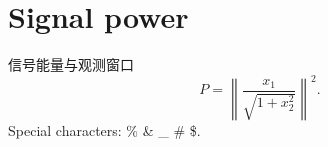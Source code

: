 \documentclass{article}
\newcommand{\norm}[1]{\left\lVert #1 \right\rVert}
\begin{document}
\section{Signal power}
{\han 信号能量与观测窗口}
\begin{equation}
  P = \norm{\frac{x_{1}}{\sqrt{1+x_{2}^{2}}}}^{2}.
\end{equation}
Special characters: \% \& \_ \# \$.
\end{document}
